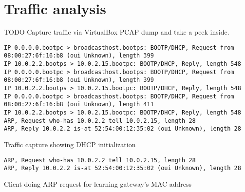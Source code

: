 
\section{Traffic analysis}

TODO Capture traffic via VirtualBox PCAP dump and take a peek inside.

\begin{table}[!ht]
\label{tab:dhcp_request}
  \begin{adjustwidth}{-3.5cm}{}
    \begin{scriptsize}
\begin{verbatim}
IP 0.0.0.0.bootpc > broadcasthost.bootps: BOOTP/DHCP, Request from 08:00:27:6f:16:b8 (oui Unknown), length 399
IP 10.0.2.2.bootps > 10.0.2.15.bootpc: BOOTP/DHCP, Reply, length 548
IP 0.0.0.0.bootpc > broadcasthost.bootps: BOOTP/DHCP, Request from 08:00:27:6f:16:b8 (oui Unknown), length 399
IP 10.0.2.2.bootps > 10.0.2.15.bootpc: BOOTP/DHCP, Reply, length 548
IP 0.0.0.0.bootpc > broadcasthost.bootps: BOOTP/DHCP, Request from 08:00:27:6f:16:b8 (oui Unknown), length 411
IP 10.0.2.2.bootps > 10.0.2.15.bootpc: BOOTP/DHCP, Reply, length 548
ARP, Request who-has 10.0.2.2 tell 10.0.2.15, length 28
ARP, Reply 10.0.2.2 is-at 52:54:00:12:35:02 (oui Unknown), length 28
\end{verbatim}
    \end{scriptsize}
  \end{adjustwidth}
  \begin{center}
    \caption{Traffic capture showing DHCP initialization}
  \end{center}
\end{table}

\begin{table}[!ht]
  \label{tab:dhcp_request}
  \begin{adjustwidth}{-3.5cm}{}
    \begin{scriptsize}
\begin{verbatim}
ARP, Request who-has 10.0.2.2 tell 10.0.2.15, length 28
ARP, Reply 10.0.2.2 is-at 52:54:00:12:35:02 (oui Unknown), length 28
\end{verbatim}
    \end{scriptsize}
  \end{adjustwidth}
  \begin{center}
    \caption{Client doing ARP request for learning gateway's MAC address}
  \end{center}
\end{table}


